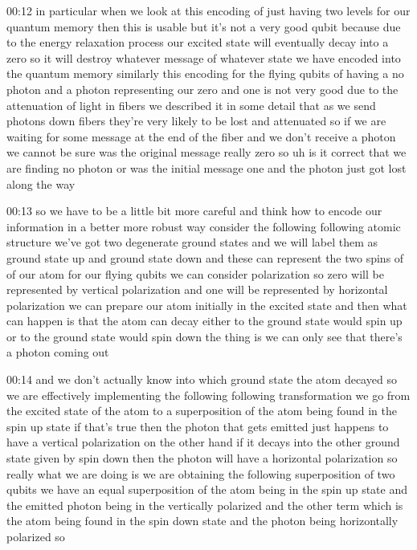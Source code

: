 00:12
in particular when we look at this encoding of just having two levels for our
quantum memory then this is usable but it's not a very good qubit
because due to the energy relaxation process our
excited state will eventually decay into a zero so it will destroy
whatever message of whatever state we have encoded into the quantum memory
similarly this encoding for the flying qubits of having a no photon and a
photon representing our zero and one is not very good due to the attenuation
of light in fibers we described it in some detail that as
we send photons down fibers they're very likely to be lost and attenuated
so if we are waiting for some message at the end of the fiber and we don't
receive a photon we cannot be sure was the original message really zero
so uh is it correct that we are finding no photon or was the
initial message one and the photon just got lost along the way

00:13
so we have to be a little bit more careful and think how to
encode our information in a better more robust way
consider the following following atomic structure
we've got two degenerate ground states and we will label them as ground state up
and ground state down and these can represent the two spins of of our atom
for our flying qubits we can consider polarization
so zero will be represented by vertical polarization
and one will be represented by horizontal polarization
we can prepare our atom initially in the excited state
and then what can happen is that the atom can decay either
to the ground state would spin up or to the ground state would spin down
the thing is we can only see that there's a photon coming out

00:14
and we don't actually know into which ground state the atom decayed so
we are effectively implementing the following following transformation
we go from the excited state of the atom to a superposition of the atom being
found in the spin up state if that's true then the photon that gets emitted
just happens to have a vertical polarization
on the other hand if it decays into the other
ground state given by spin down then the photon will have a horizontal
polarization so really what we are doing is we are obtaining the following
superposition of two qubits we have an equal superposition of the
atom being in the spin up state and the emitted photon being in the
vertically polarized and the other term which is the atom being
found in the spin down state and the photon being horizontally polarized so

